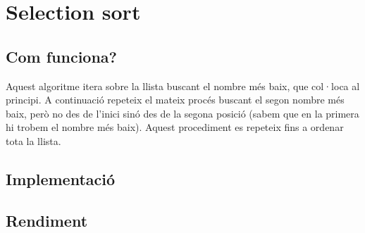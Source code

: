 \chapter{Selection sort}

\section{Com funciona?}
Aquest algoritme itera sobre la llista buscant el nombre més baix, que col·loca al principi.
A continuació repeteix el mateix procés buscant el segon nombre més baix, però no des de l'inici sinó des de la segona posició (sabem que en la primera hi trobem el nombre més baix).
Aquest procediment es repeteix fins a ordenar tota la llista.

\section{Implementació}

\begin{minipage}{\textwidth}
	\section{Rendiment}
	\noindent
	\makebox[\textwidth][c]{
		
	}
	\vspace*{1em}
	\begin{center}
		\resizebox{\textwidth}{!}{}
	\end{center}
\end{minipage}
